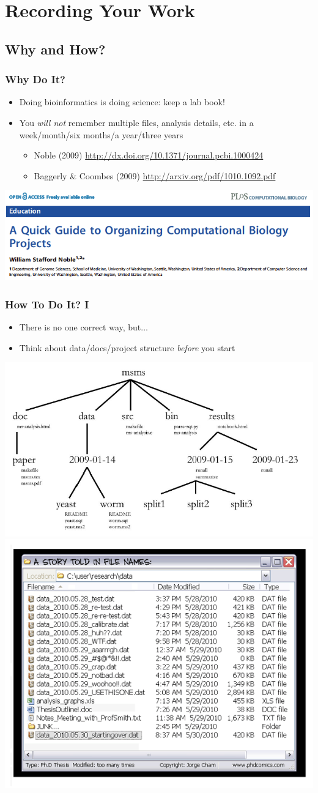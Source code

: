 \documentclass[table]{beamer}
\begin{document}
   \section{Recording Your Work}
   
   \subsection{Why and How?}
   \begin{frame}
     \frametitle{Why Do It?}
     \begin{itemize}
	   \item Doing bioinformatics is doing science: keep a lab book!
	   \item You \emph{will not} remember multiple files, analysis details, etc. in a week/month/six months/a year/three years
	   \begin{itemize}
	     \item Noble (2009) \url{http://dx.doi.org/10.1371/journal.pcbi.1000424}
	     \item Baggerly \& Coombes (2009) \url{http://arxiv.org/pdf/1010.1092.pdf}
	   \end{itemize}
	\end{itemize}
	\includegraphics[width=.6\textwidth]{images/noble_2009_head}
   \end{frame}
   
   \begin{frame}
     \frametitle{How To Do It? I}
     \begin{itemize}
	   \item There is no one correct way, but$\ldots$
	   \item Think about data/docs/project structure \textit{before} you start
	\end{itemize}
    \includegraphics[width=.5\textwidth]{images/project_structure}
    \includegraphics[width=.5\textwidth]{images/phd052810s}
   \end{frame}
\end{document}
